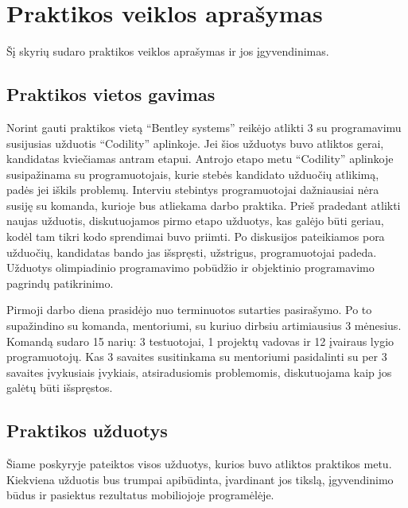 \section{Praktikos veiklos aprašymas}
Šį skyrių sudaro praktikos veiklos aprašymas ir jos įgyvendinimas.

\subsection{Praktikos vietos gavimas}
Norint gauti praktikos vietą \enquote{Bentley systems} reikėjo atlikti 3 su programavimu susijusias užduotis \enquote{Codility} aplinkoje. Jei šios užduotys buvo atliktos gerai, kandidatas kviečiamas antram etapui. Antrojo etapo metu \enquote{Codility} aplinkoje susipažinama su programuotojais, kurie stebės kandidato užduočių atlikimą, padės jei iškils problemų. Interviu stebintys programuotojai dažniausiai nėra susiję su komanda, kurioje bus atliekama darbo praktika. Prieš pradedant atlikti naujas užduotis, diskutuojamos pirmo etapo užduotys, kas galėjo būti geriau, kodėl tam tikri kodo sprendimai buvo priimti. Po diskusijos pateikiamos pora užduočių, kandidatas bando jas išspręsti, užstrigus, programuotojai padeda. Užduotys olimpiadinio programavimo pobūdžio ir objektinio programavimo pagrindų patikrinimo.

Pirmoji darbo diena prasidėjo nuo terminuotos sutarties pasirašymo. Po to supažindino su komanda, mentoriumi, su kuriuo dirbsiu artimiausius 3 mėnesius. Komandą sudaro 15 narių: 3 testuotojai, 1 projektų vadovas ir 12 įvairaus lygio programuotojų. Kas 3 savaites susitinkama su mentoriumi pasidalinti su per 3 savaites įvykusiais įvykiais, atsiradusiomis problemomis, diskutuojama kaip jos galėtų būti išspręstos.




\subsection{Praktikos užduotys}

Šiame poskyryje pateiktos visos užduotys, kurios buvo atliktos praktikos metu. Kiekviena užduotis bus trumpai apibūdinta, įvardinant jos tikslą, įgyvendinimo būdus ir pasiektus rezultatus mobiliojoje programėlėje.

